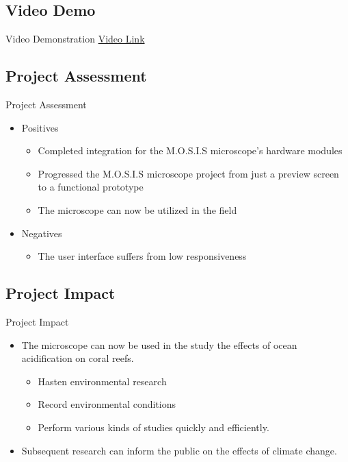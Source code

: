 \documentclass[17pt, aspectratio=169]{beamer}
\begin{document}
\subsection{Video Demo}
\begin{frame}{Video Demonstration}
	\href{https://youtu.be/JZFvu8QhQfI}{Video Link}
\end{frame}
\subsection{Project Assessment}
\begin{frame}{Project Assessment}
	\begin{itemize}
		\item Positives
		      \begin{itemize}
			      \item Completed integration for the M.O.S.I.S microscope's hardware modules
			      \item Progressed the M.O.S.I.S microscope project from just a preview screen to a functional prototype
			      \item The microscope can now be utilized in the field
		      \end{itemize}
		\item Negatives
		      \begin{itemize}
			      \item The user interface suffers from low responsiveness
		      \end{itemize}
	\end{itemize}
\end{frame}
\subsection*{Project Impact}
\begin{frame}{Project Impact}
	\begin{itemize}
		\item The microscope can now be used in the study the effects of ocean acidification on coral reefs.
		      \begin{itemize}
			      \item Hasten environmental research
			      \item Record environmental conditions
			      \item Perform various kinds of studies quickly and efficiently.
		      \end{itemize}
		\item Subsequent research can inform the public on the effects of climate change.
	\end{itemize}
\end{frame}
\end{document}
